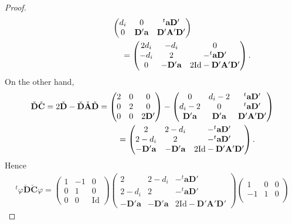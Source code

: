\documentclass[pdftex]{sigma}
\numberwithin{equation}{section}
\theoremstyle{definition}
\newcommand{\unit}{\mathrm{Id}}
\newcommand{\bA}{\mathbf{A}} %
\newcommand{\bD}{\mathbf{D}} %
\newcommand{\bC}{\mathbf{C}} %
\begin{document}
\begin{proof}
\begin{gather*}
\begin{pmatrix}
d_i & 0 & {}^t \mathbf{a}\bD' \\
0 & \bD'\mathbf{a} & \bD'\bA'\bD'
\end{pmatrix} \\
\hphantom{\bD \bC = 2\bD - \bD \bA \bD}{}
=
\begin{pmatrix}
2d_i & -d_i & 0 \\
-d_i & 2 & -{}^t \mathbf{a}\bD' \\
0 & -\bD'\mathbf{a} & 2\unit -\bD'\bA'\bD'
\end{pmatrix}.
\end{gather*}
On the other hand,
\begin{gather*}
\check{\bD} \check{\bC} = 2\check{\bD} - \check{\bD} \check{\bA} \check{\bD}
= \begin{pmatrix}
2 & 0 & 0 \\
0 & 2 & 0 \\
0 & 0 & 2\bD'
\end{pmatrix} -
\begin{pmatrix}
0 & d_i-2 & {}^t \mathbf{a}\bD' \\
d_i-2 & 0 & {}^t \mathbf{a}\bD' \\
\bD'\mathbf{a} & \bD'\mathbf{a} & \bD'\bA'\bD'
\end{pmatrix} \\
\hphantom{\check{\bD} \check{\bC} = 2\check{\bD} - \check{\bD} \check{\bA} \check{\bD}}{}
=
\begin{pmatrix}
2 & 2-d_i & -{}^t \mathbf{a}\bD' \\
2-d_i & 2 & -{}^t \mathbf{a}\bD' \\
-\bD'\mathbf{a} & -\bD'\mathbf{a} & 2\unit -\bD'\bA'\bD'
\end{pmatrix}.
\end{gather*}
Hence
\begin{gather*}
{}^t \varphi \check{\bD} \check{\bC} \varphi
=
\begin{pmatrix}
1 & -1 & 0 \\
0 & 1  & 0 \\
0 & 0  & \unit
\end{pmatrix}
\begin{pmatrix}
2 & 2-d_i & -{}^t \mathbf{a}\bD' \\
2-d_i & 2 & -{}^t \mathbf{a}\bD' \\
-\bD'\mathbf{a} & -\bD'\mathbf{a} & 2\unit -\bD'\bA'\bD'
\end{pmatrix}
\begin{pmatrix}
1  & 0 & 0 \\
-1 & 1 & 0 \\

\end{pmatrix}
\end{gather*}
\end{proof}
\end{document}
